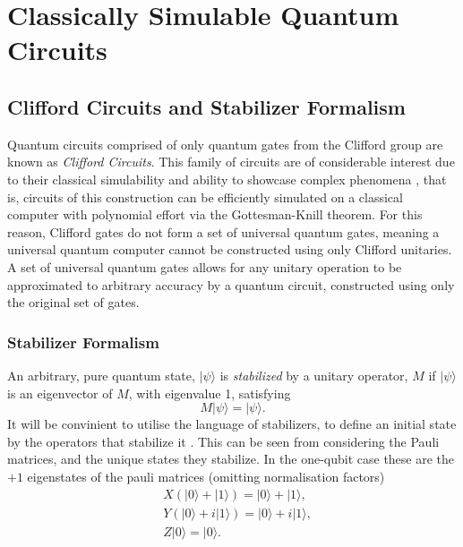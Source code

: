 \section{Classically Simulable Quantum Circuits}
\subsection{Clifford Circuits and Stabilizer Formalism}

Quantum circuits comprised of only quantum gates from the Clifford group are known as \textit{Clifford Circuits}.
This family of circuits are of considerable interest due to their classical simulability and ability to
showcase complex phenomena \cite{doi:10.1063/5.0054863}, that is,
circuits of this construction can be efficiently simulated on a classical computer with polynomial
effort via the Gottesman-Knill theorem. For this reason, Clifford gates do not form
a set of universal quantum gates, meaning a universal quantum computer cannot be constructed using only
Clifford unitaries. A set of universal quantum gates allows for any unitary operation to be approximated to
arbitrary accuracy by a quantum circuit, constructed using only the original set of gates.

\subsubsection{Stabilizer Formalism}
An arbitrary, pure quantum state, $|\psi\rangle$ is \textit{stabilized} by
a unitary operator, $M$ if $|\psi\rangle$  is an eigenvector of $M$, with eigenvalue 1, satisfying
\begin{equation}
    M|\psi\rangle = |\psi\rangle.
\end{equation}
It will be convinient to utilise the language of stabilizers, to define an initial state by the operators that stabilize it
\cite{PhysRevA.70.052328}.
This can be seen from considering the Pauli matrices, and the unique states they stabilize. In the one-qubit case these are
the $+1$ eigenstates of the pauli matrices (omitting normalisation factors)
\begin{align}
     & X(|0\rangle + |1\rangle) = |0\rangle + |1\rangle,   \\
     & Y(|0\rangle + i|1\rangle) = |0\rangle + i|1\rangle, \\
     & Z|0\rangle = |0\rangle.
\end{align}

